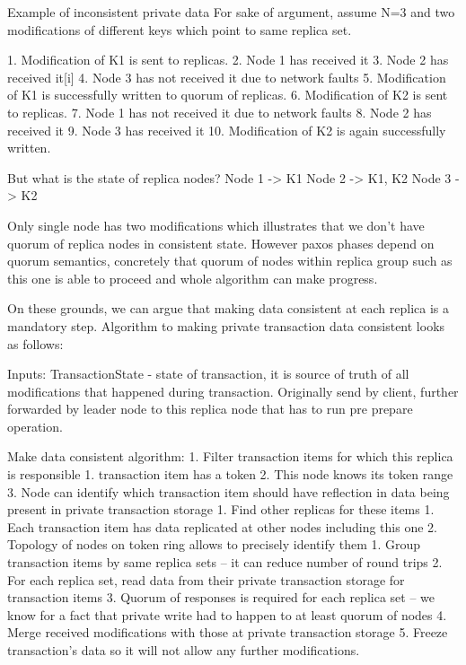 Example of inconsistent private data
For sake of argument, assume N=3 and two modifications of different keys which point to same replica set.


1. Modification of K1 is sent to replicas.
2. Node 1 has received it
3. Node 2 has received it[i]
4. Node 3 has not received it due to network faults
5. Modification of K1 is successfully written to quorum of replicas.
6. Modification of K2 is sent to replicas.
7. Node 1 has not received it due to network faults
8. Node 2 has received it
9. Node 3 has received it
10. Modification of K2 is again successfully written.


But what is the state of replica nodes?
Node 1 -> { K1 }
Node 2 -> { K1, K2 }
Node 3 -> { K2 }


Only single node has two modifications which illustrates that we don’t have quorum of replica nodes in consistent state. However paxos phases depend on quorum semantics, concretely that quorum of nodes within replica group such as this one is able to proceed and whole algorithm can make progress. 


On these grounds, we can argue that making data consistent at each replica is a mandatory step.
Algorithm to making private transaction data consistent looks as follows:


Inputs:
        TransactionState - state of transaction, it is source of truth of all modifications that happened during transaction. Originally send by client, further forwarded by leader node to this replica node that has to run pre prepare operation.


        Make data consistent algorithm:        
1. Filter transaction items for which this replica is responsible
   1. transaction item has a token
   2. This node knows its token range
   3. Node can identify which transaction item should have reflection in data being present in private transaction storage
1. Find other replicas for these items
   1. Each transaction item has data replicated at other nodes including this one
   2. Topology of nodes on token ring allows to precisely identify them
1. Group transaction items by same replica sets -- it can reduce number of round trips
2. For each replica set, read data from their private transaction storage for transaction items
3. Quorum of responses is required for each replica set -- we know for a fact that private write had to happen to at least quorum of nodes
4. Merge received modifications with those at private transaction storage
5. Freeze transaction’s data so it will not allow any further modifications.


